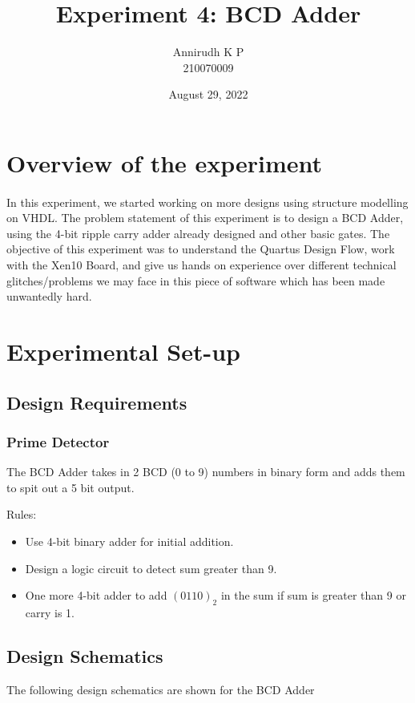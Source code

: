 \documentclass[12pt]{article}
\title{Experiment 4: BCD Adder}
\author{Annirudh K P\\%
210070009}
\date{August 29, 2022}
\begin{document}
\maketitle

\section{Overview of the experiment}
\paragraph{}
In this experiment, we started working on more designs using structure modelling on VHDL. The problem statement of this experiment is to design a BCD Adder, using the 4-bit ripple carry adder already designed and other basic gates. The objective of this experiment was to understand the Quartus Design Flow, work with the Xen10 Board, and give us hands on experience over different technical glitches/problems we may face in this piece of software which has been made unwantedly hard.

\section{Experimental Set-up}

\subsection{Design Requirements}
\subsubsection{Prime Detector}
The BCD Adder takes in 2 BCD (0 to 9) numbers in binary form and adds them to spit out a 5 bit output.

Rules:
\begin{itemize}
\item Use 4-bit binary adder for initial addition.
\item Design a logic circuit to detect sum greater than 9.
\item One more 4-bit adder to add $(0110)_2$ in the sum if sum is greater than 9 or carry is 1.
\end{itemize}

\subsection{Design Schematics}
The following design schematics are shown for the BCD Adder 
\end{document}
